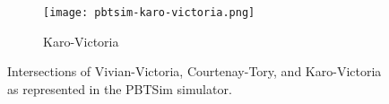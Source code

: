 \begin{appendices}
\begin{figure}[]
\vspace{1cm}

\begin{subfigure}{.5\textwidth}
  \centering
  \texttt{[image: pbtsim-karo-victoria.png]}
  \caption{Karo-Victoria}
  \label{fig:sub1}
\end{subfigure}%
\caption[Intersections of Vivian-Victoria, Courtenay-Tory, and Karo-Victoria as represented in the PBTSim simulator.]{ Intersections of Vivian-Victoria, Courtenay-Tory, and Karo-Victoria as represented in the PBTSim simulator.  }
\label{pbtsim_intersections}
\end{figure}

\end{appendices}
